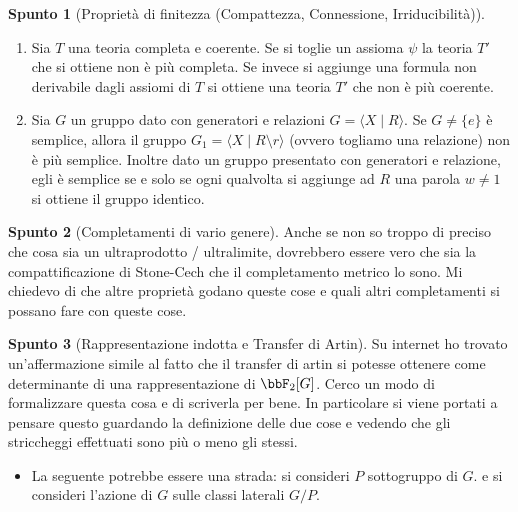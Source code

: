 \documentclass[a4paper,NoNotes,GeneralMath]{stdmdoc}
\theoremstyle{definition}
\newtheorem{spunto}{Spunto}
\begin{document}
\begin{spunto}[Proprietà di finitezza (Compattezza, Connessione, Irriducibilità)]
\begin{enumerate}
				\begin{enumerate}
					\item Se $\tau \subseteq \tau_{+}$ allora $(X, \tau_{+})$ non è più compatto.
					\item Se $\tau_{-} \subseteq \tau$ allora $(X, \tau_{-})$ non è più di Haussdorf.
				\end{enumerate}
			\item Sia $T$ una teoria completa e coerente. Se si toglie un assioma $\psi$ la teoria $T'$ che si ottiene non è più completa. Se invece si aggiunge una formula non derivabile dagli assiomi di $T$ si ottiene una teoria $T'$ che non è più coerente.
			\item Sia $G$ un gruppo dato con generatori e relazioni $G = \langle X \mid R \rangle$. Se $G \neq \{ e \}$ è semplice, allora il gruppo $G_1 = \langle X \mid R \setminus r \rangle$ (ovvero togliamo una relazione) non è più semplice.
				Inoltre dato un gruppo presentato con generatori e relazione, egli è semplice se e solo se ogni qualvolta si aggiunge ad $R$ una parola $w \neq 1$ si ottiene il gruppo identico.
		\end{enumerate} 
	\end{spunto}
	
	\begin{spunto}[Completamenti di vario genere]
		Anche se non so troppo di preciso che cosa sia un ultraprodotto / ultralimite, dovrebbero essere vero che sia la compattificazione di Stone-Cech che il completamento metrico lo sono. Mi chiedevo di che altre proprietà godano queste cose e quali altri completamenti si possano fare con queste cose.
	\end{spunto}
	
	\begin{spunto}[Rappresentazione indotta e Transfer di Artin]
		Su internet ho trovato un'affermazione simile al fatto che il transfer di artin si potesse ottenere come determinante di una rappresentazione di $\bbF_2 [G]$. Cerco un modo di formalizzare questa cosa e di scriverla per bene. In particolare si viene portati a pensare questo guardando la definizione delle due cose e vedendo che gli striccheggi effettuati sono più o meno gli stessi. \\
		\begin{itemize}
			\item La seguente potrebbe essere una strada: si consideri $P$ sottogruppo di $G$. e si consideri l'azione di $G$ sulle classi laterali $G/P$. 
		\end{itemize}
	\end{spunto}
	
\end{document}
